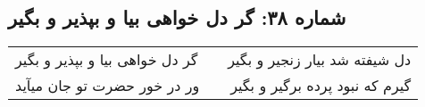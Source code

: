 \begin{center}
\section*{شماره ۳۸: گر دل خواهی بیا و بپذیر و بگیر}
\label{sec:038}
\begin{longtable}{l p{0.5cm} r}
گر دل خواهی بیا و بپذیر و بگیر
&&
دل شیفته شد بیار زنجیر و بگیر
\\
ور در خور حضرت تو جان میآید
&&
گیرم که نبود پرده برگیر و بگیر
\\
\end{longtable}
\end{center}
